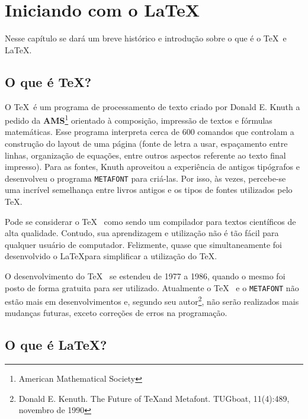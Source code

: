 %
%
%
%
\chapter{Iniciando com o \LaTeX}

Nesse capítulo se dará um breve histórico e introdução sobre o que é o \TeX~e \LaTeX.

\section{O que é \TeX?}

O \TeX~é um programa de processamento de texto criado por Donald E. Knuth \cite{Knuth1984} a pedido da \textbf{AMS}\footnote{American Mathematical Society} orientado à composição, impressão de textos e fórmulas matemáticas. Esse programa interpreta cerca de 600 comandos que controlam a construção do layout de uma página (fonte de letra a usar, espaçamento entre linhas, organização de equações, entre outros aspectos referente ao texto final impresso). Para as fontes, Knuth aproveitou a experiência de antigos tipógrafos e desenvolveu o programa \texttt{METAFONT} para criá-las. Por isso, às vezes, percebe-se uma incrível semelhança entre livros antigos e os tipos de fontes utilizados pelo \TeX.

Pode se considerar o \TeX~ como sendo um compilador para textos científicos de alta qualidade. Contudo, sua aprendizagem e utilização não é tão fácil para qualquer usuário de computador. Felizmente, quase que simultaneamente foi desenvolvido o \LaTeX para simplificar a utilização do \TeX.

O desenvolvimento do \TeX~ se estendeu de 1977 a 1986, quando o mesmo foi posto de forma gratuita para ser utilizado. Atualmente o \TeX~ e o \texttt{METAFONT} não estão mais em desenvolvimentos e, segundo seu autor\footnote{Donald E. Kenuth. The Future of \TeX and Metafont. TUGboat, 11(4):489, novembro de 1990}, não serão realizados mais mudanças futuras, exceto correções de erros na programação.

\section{O que é \LaTeX?}

